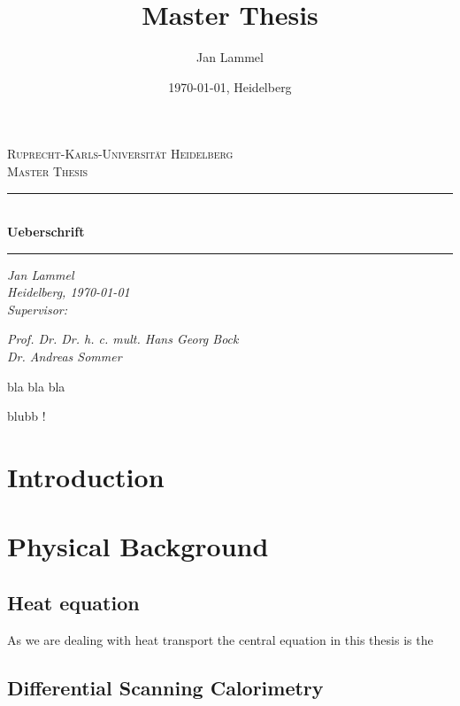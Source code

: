 \documentclass{scrartcl}[12pt, halfparskip]
\title{Master Thesis}
\author{Jan Lammel}
\date{\today{}, Heidelberg}
\begin{document}
\begin{titlepage}
	\begin{center}
	
	\textsc{\large Ruprecht-Karls-Universit\"{a}t Heidelberg} \\[0.5cm]
	\textsc{\large Master Thesis}\\[1cm]
	
	\newcommand{\HRule}{\rule{\linewidth}{0.5mm}}
	\HRule \\[0.4cm]
	\huge \bfseries Ueberschrift
	\HRule 
	
	\vspace{11cm}
	
	\Large \textit{Jan Lammel }\\
	\Large \textit{Heidelberg, \today }\\ \vspace{0.5cm}
	\Large \textit{Supervisor:}
	
	\Large \textit{Prof. Dr. Dr. h. c. mult. Hans Georg Bock}\\
	\Large \textit{Dr. Andreas Sommer}
	
	\end{center}
\end{titlepage}

\newpage

\tableofcontents 
\newpage

 

 bla bla bla
 
 
 \newpage

blubb !

\newpage
{}
\section{Introduction}

\section{Physical Background}
\subsection{Heat equation}
As we are dealing with heat transport the central equation in this thesis is the



\subsection{Differential Scanning Calorimetry}
\end{document}
